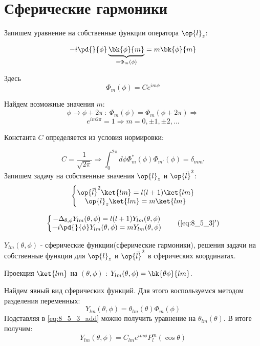 \section{Сферические гармоники}

Запишем уравнение на собственные функции оператора $\op{l}_z$:

\begin{equation}
\label{eq:8_5_1}
-i \pd{}{\phi} \underbrace{\bk{\phi}{m}}_{=\Phi_m(\phi)} = m \bk{\phi}{m}
\end{equation}

Здесь 
\begin{equation}
\label{eq:8_5_2}
  \Phi_m(\phi) = C e^{i m \phi}
\end{equation}

Найдем возможные значения $m$:
$$
\phi \to \phi + 2\pi ~:~\Phi_m(\phi) = \Phi_m(\phi + 2\pi) \Rightarrow 
$$
$$
e^{im2\pi} = 1 \Rightarrow \boxed{m=0, \pm 1, \pm 2, ...}
$$

Константа $C$ определяется из условия нормировки:

$$
C = \frac{1}{\sqrt{2\pi}} \Rightarrow \int_0^{2\pi} d\phi \Phi^*_m(\phi) \Phi_{m'}(\phi) = \delta_{mm'} 
$$
Запишем задачу на собственные значения $\op{l}_z$ и $\op{\vec l}^2$:
\begin{equation}
\label{eq:8_5_3}
\left\{
  \begin{matrix}
    \op{\vec{l}}^2 \ket{lm} = l(l+1)\ket{lm} \\
    \op{l}_z \ket{lm} = m \ket{lm}
  \end{matrix}
\right.
\end{equation}


\begin{equation}
\left\{
  \begin{matrix}
  \label{eq:8_5_3_add}
   - \Delta_{\theta, \phi} Y_{lm}(\theta, \phi) = l(l+1) Y_{lm}(\theta, \phi) 
    \\
     -i\pd{}{\phi} Y_{lm}(\theta, \phi) = m Y_{lm}(\theta, \phi) 
  \end{matrix}
\right .
\tag{\ref{eq:8_5_3}$'$}
\end{equation}
  
$Y_{lm}(\theta, \phi)$ - сферические функции(сферические гармоники), решения задачи на собственные функции для $\op{l}_z$ и $\op{\vec l}^2$ в сферических координатах.

Проекция $\ket{lm}$ на $(\theta, \phi)$ : $Y_{lm}(\theta, \phi) = \bk{\theta \phi}{lm}$.

Найдем явный вид сферических функций. Для этого воспользуемся методом разделения переменных:
$$
Y_{lm}(\theta, \phi) = \theta_{lm}(\theta) \Phi_m(\phi)
$$
Подставляя в \eqref{eq:8_5_3_add} можно получить уравнение на $\theta_{lm}(\theta)$. В итоге получим:
$$
\boxed{Y_{lm}(\theta, \phi) = C_{lm} e^{im\phi} P^m_l(\cos \theta)}
$$

